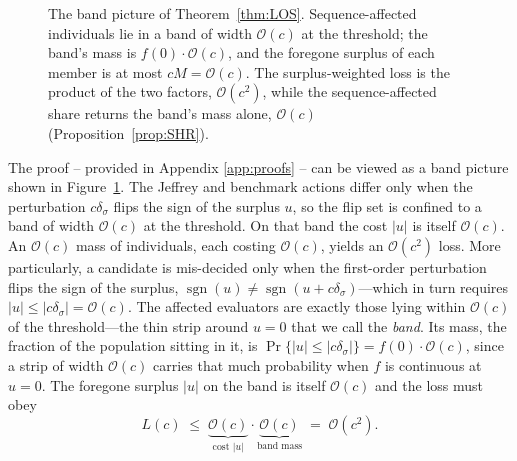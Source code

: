 \documentclass[a4paper,fleqn]{cas-sc}
\theoremstyle{remark}
\theoremstyle{definition}
\newcommand{\PB}{P^{\mathrm{B}}}
\newcommand{\sgn}{\operatorname{sgn}}
\newcommand{\bigO}{\mathcal{O}}
\begin{document}
\begin{figure}[t]
\centering
{}
\caption{The band picture of Theorem~\ref{thm:LOS}. Sequence-affected individuals lie in a band
of width $\bigO(c)$ at the threshold; the band's mass is $f(0)\cdot\bigO(c)$, and the foregone
surplus of each member is at most $cM=\bigO(c)$. The surplus-weighted loss is the product of the
two factors, $\bigO(c^{2})$, while the sequence-affected share returns the band's mass alone,
$\bigO(c)$ (Proposition~\ref{prop:SHR}).}
\label{fig:band}
\end{figure}

The proof -- provided in Appendix \ref{app:proofs} -- can be viewed as a band picture shown in Figure~\ref{fig:band}. The Jeffrey and benchmark
actions differ only when the perturbation $c\delta_\sigma$ flips the sign of the surplus $u$, so
the flip set is confined to a band of width $\bigO(c)$ at the threshold. On that band the cost
$|u|$ is itself $\bigO(c)$. An $\bigO(c)$ mass of individuals, each costing $\bigO(c)$, yields an
$\bigO(c^{2})$ loss. More particularly, a candidate is mis-decided only when the first-order perturbation flips the sign of the surplus, $\sgn(u)\neq\sgn(u+c\delta_\sigma)$---which in turn requires
$|u|\le|c\delta_\sigma|=\bigO(c)$. The affected evaluators are exactly those lying within $\bigO(c)$ of the threshold---the thin strip around
$u=0$ that we call the \emph{band}. Its mass, the fraction of the population sitting in it, is
$\Pr\{|u|\le|c\delta_\sigma|\}=f(0)\cdot\bigO(c)$, since a strip of width $\bigO(c)$ carries that
much probability when $f$ is continuous at $u=0$. The foregone surplus $|u|$ on the band is itself $\bigO(c)$ and the loss must obey
\[
  L(c)\;\le\;\underbrace{\bigO(c)}_{\text{cost }|u|}\cdot\underbrace{\bigO(c)}_{\text{band mass}}
       \;=\;\bigO(c^{2}).
\]
\end{document}
